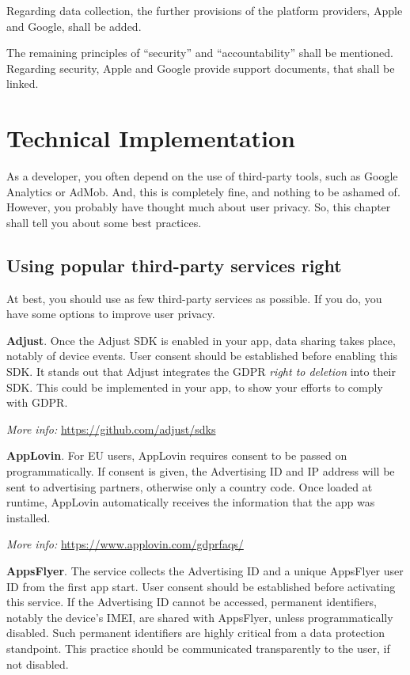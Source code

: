 \documentclass[
]{book}
\begin{document}
Regarding data collection, the further provisions of the platform providers, Apple and Google, shall be added.

The remaining principles of ``security'' and ``accountability'' shall be mentioned. Regarding security, Apple and Google provide support documents, that shall be linked.

\hypertarget{technical-implementation}{%
\chapter{Technical Implementation}\label{technical-implementation}}

As a developer, you often depend on the use of third-party tools, such as Google Analytics or AdMob. And, this is completely fine, and nothing to be ashamed of. However, you probably have thought much about user privacy. So, this chapter shall tell you about some best practices.

\hypertarget{using-popular-third-party-services-right}{%
\section{Using popular third-party services right}\label{using-popular-third-party-services-right}}

At best, you should use as few third-party services as possible. If you do, you have some options to improve user privacy.

\textbf{Adjust}. Once the Adjust SDK is enabled in your app, data sharing takes place, notably of device events. User consent should be established before enabling this SDK. It stands out that Adjust integrates the GDPR \emph{right to deletion} into their SDK. This could be implemented in your app, to show your efforts to comply with GDPR.

\emph{More info:} \url{https://github.com/adjust/sdks}

\textbf{AppLovin}. For EU users, AppLovin requires consent to be passed on programmatically. If consent is given, the Advertising ID and IP address will be sent to advertising partners, otherwise only a country code. Once loaded at runtime, AppLovin automatically receives the information that the app was installed.

\emph{More info:} \url{https://www.applovin.com/gdprfaqs/}

\textbf{AppsFlyer}. The service collects the Advertising ID and a unique AppsFlyer user ID from the first app start. User consent should be established before activating this service. If the Advertising ID cannot be accessed, permanent identifiers, notably the device's IMEI, are shared with AppsFlyer, unless programmatically disabled. Such permanent identifiers are highly critical from a data protection standpoint. This practice should be communicated transparently to the user, if not disabled.
\end{document}
